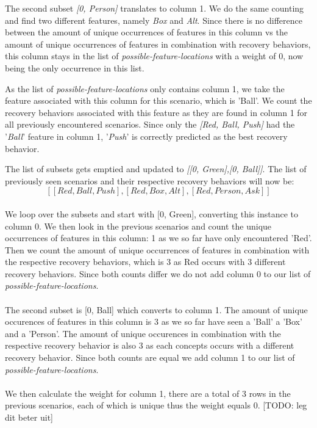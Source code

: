 \documentclass{article}
\begin{document}
The second subset \textit{[0, Person]} translates to column 1. We do the same counting and find two different features, namely \textit{Box} and \textit{Alt}. Since there is no difference between the amount of unique occurrences of features in this column vs the amount of unique occurrences of features in combination with recovery behaviors, this column stays in the list of \textit{possible-feature-locations} with a weight of 0, now being the only occurrence in this list. 
\begin{quote}
\textit{}
\end{quote}
As the list of \textit{possible-feature-locations} only contains column 1, we take the feature associated with this column for this scenario, which is 'Ball'. We count the recovery behaviors associated with this feature as they are found in column 1 for all previously encountered scenarios. Since only the \textit{[Red, Ball, Push]} had the '\textit{Ball}' feature in column 1, '\textit{Push}' is correctly predicted as the best recovery behavior. 

\begin{quote}
\textit{}
\end{quote}
The list of subsets gets emptied and updated to \textit{[[0, Green],[0, Ball]]}. The list of previously seen scenarios and their respective recovery behaviors will now be: $$[[Red, Ball, Push],[Red, Box, Alt],[Red, Person, Ask]]$$
\\
We loop over the subsets and start with [0, Green], converting this instance to column 0. We then look in the previous scenarios and count the unique occurrences of features in this column: 1 as we so far have only encountered 'Red'. Then we count the amount of unique occurrences of features in combination with the respective recovery behaviors, which is 3 as Red occurs with 3 different recovery behaviors. Since both counts differ we do not add column 0 to our list of \textit{possible-feature-locations}. 
\\\\
The second subset is [0, Ball] which converts to column 1. The amount of unique occurences of features in this column is 3 as we so far have seen a 'Ball' a 'Box' and a 'Person'. The amount of unique occurences in combination with the respective recovery behavior is also 3 as each concepts occurs with a different recovery behavior. Since both counts are equal we add column 1 to our list of \textit{possible-feature-locations}. 
\\\\
We then calculate the weight for column 1, there are a total of 3 rows in the previous scenarios, each of which is unique thus the weight equals 0. [TODO: leg dit beter uit]
\end{document}
